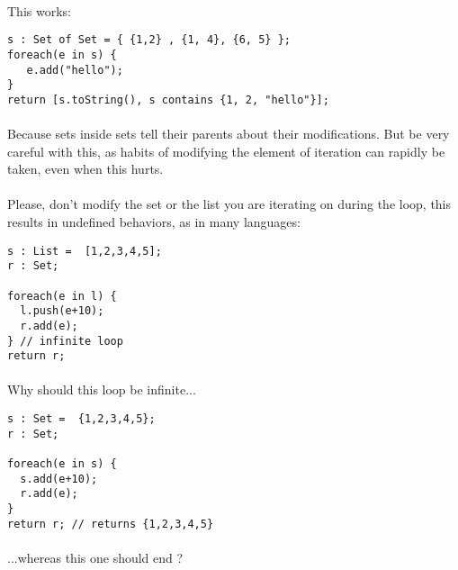 \documentclass{article}
\begin{document}
\begin{sloppypar}
            
\paragraph{}
This works:
{\begin{lstlisting}
s : Set of Set = { {1,2} , {1, 4}, {6, 5} };
foreach(e in s) {
   e.add("hello");
}
return [s.toString(), s contains {1, 2, "hello"}];
\end{lstlisting}
}


            
\paragraph{}
Because sets inside sets tell their parents about their modifications. But be very careful with this, as habits of modifying the element of iteration can rapidly be taken, even when this hurts.

            
\paragraph{}
Please, don't modify the set or the list you are iterating on during the loop, this results in undefined behaviors, as in many languages:

{\begin{lstlisting}
s : List =  [1,2,3,4,5];
r : Set;

foreach(e in l) {
  l.push(e+10);
  r.add(e);
} // infinite loop
return r;
\end{lstlisting}
}

            
\paragraph{}
Why should this loop be infinite...

{\begin{lstlisting}
s : Set =  {1,2,3,4,5};
r : Set;

foreach(e in s) {
  s.add(e+10);
  r.add(e);
}
return r; // returns {1,2,3,4,5}
\end{lstlisting}
}

            
\paragraph{}
...whereas this one should end ?
         
         
         


\end{sloppypar}
\end{document}
